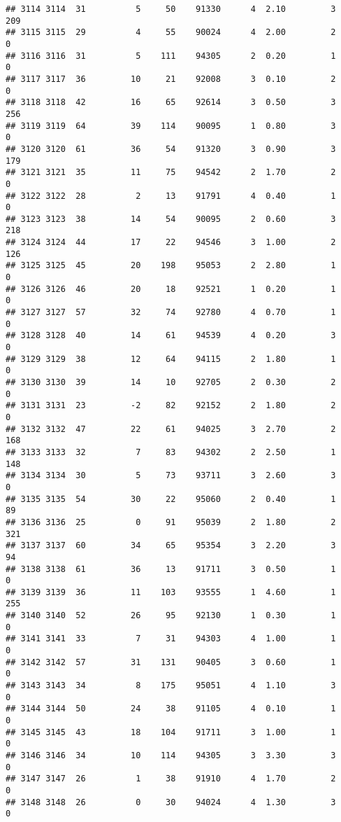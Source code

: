 \documentclass[
]{article}
\begin{document}
\begin{verbatim}
## 3114 3114  31          5     50    91330      4  2.10         3      209
## 3115 3115  29          4     55    90024      4  2.00         2        0
## 3116 3116  31          5    111    94305      2  0.20         1        0
## 3117 3117  36         10     21    92008      3  0.10         2        0
## 3118 3118  42         16     65    92614      3  0.50         3      256
## 3119 3119  64         39    114    90095      1  0.80         3        0
## 3120 3120  61         36     54    91320      3  0.90         3      179
## 3121 3121  35         11     75    94542      2  1.70         2        0
## 3122 3122  28          2     13    91791      4  0.40         1        0
## 3123 3123  38         14     54    90095      2  0.60         3      218
## 3124 3124  44         17     22    94546      3  1.00         2      126
## 3125 3125  45         20    198    95053      2  2.80         1        0
## 3126 3126  46         20     18    92521      1  0.20         1        0
## 3127 3127  57         32     74    92780      4  0.70         1        0
## 3128 3128  40         14     61    94539      4  0.20         3        0
## 3129 3129  38         12     64    94115      2  1.80         1        0
## 3130 3130  39         14     10    92705      2  0.30         2        0
## 3131 3131  23         -2     82    92152      2  1.80         2        0
## 3132 3132  47         22     61    94025      3  2.70         2      168
## 3133 3133  32          7     83    94302      2  2.50         1      148
## 3134 3134  30          5     73    93711      3  2.60         3        0
## 3135 3135  54         30     22    95060      2  0.40         1       89
## 3136 3136  25          0     91    95039      2  1.80         2      321
## 3137 3137  60         34     65    95354      3  2.20         3       94
## 3138 3138  61         36     13    91711      3  0.50         1        0
## 3139 3139  36         11    103    93555      1  4.60         1      255
## 3140 3140  52         26     95    92130      1  0.30         1        0
## 3141 3141  33          7     31    94303      4  1.00         1        0
## 3142 3142  57         31    131    90405      3  0.60         1        0
## 3143 3143  34          8    175    95051      4  1.10         3        0
## 3144 3144  50         24     38    91105      4  0.10         1        0
## 3145 3145  43         18    104    91711      3  1.00         1        0
## 3146 3146  34         10    114    94305      3  3.30         3        0
## 3147 3147  26          1     38    91910      4  1.70         2        0
## 3148 3148  26          0     30    94024      4  1.30         3        0

\end{verbatim}
\end{document}
